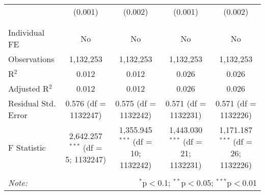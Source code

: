 \documentclass[
]{article}
\begin{document}
\begin{table}[!htbp]
{\begin{tabular}{@{\extracolsep{5pt}}lcccc}
  & (0.001) & (0.002) & (0.001) & (0.002) \\ 
  & & & & \\ 
\hline \\[-1.8ex] 
Individual FE & No & No & No & No \\ 
Observations & 1,132,253 & 1,132,253 & 1,132,253 & 1,132,253 \\ 
R$^{2}$ & 0.012 & 0.012 & 0.026 & 0.026 \\ 
Adjusted R$^{2}$ & 0.012 & 0.012 & 0.026 & 0.026 \\ 
Residual Std. Error & 0.576 (df = 1132247) & 0.575 (df = 1132242) & 0.571 (df = 1132231) & 0.571 (df = 1132226) \\ 
F Statistic & 2,642.257$^{***}$ (df = 5; 1132247) & 1,355.945$^{***}$ (df = 10; 1132242) & 1,443.030$^{***}$ (df = 21; 1132231) & 1,171.187$^{***}$ (df = 26; 1132226) \\ 
\hline 
\hline \\[-1.8ex] 
\textit{Note:}  & \multicolumn{4}{r}{$^{*}$p$<$0.1; $^{**}$p$<$0.05; $^{***}$p$<$0.01} \\ 
\end{tabular}
} 
\end{table} 
\newpage
\end{document}
